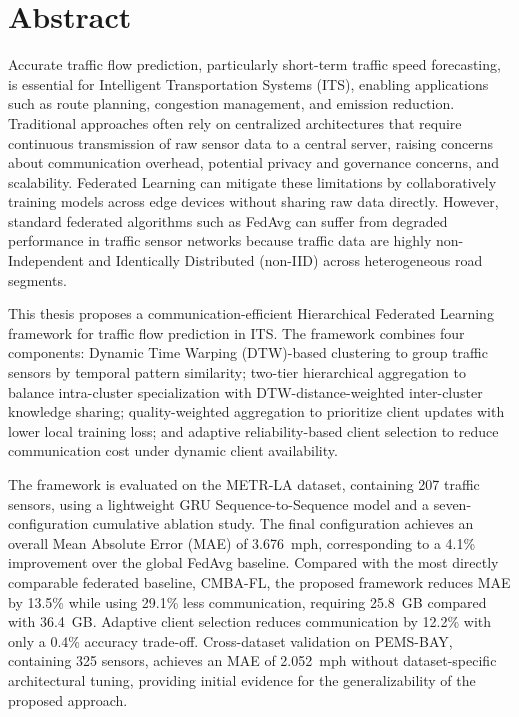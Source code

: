 \chapter*{Abstract}
\label{chap:abstract}

Accurate traffic flow prediction, particularly short-term traffic speed forecasting, is essential for Intelligent Transportation Systems (ITS), enabling applications such as route planning, congestion management, and emission reduction. Traditional approaches often rely on centralized architectures that require continuous transmission of raw sensor data to a central server, raising concerns about communication overhead, potential privacy and governance concerns, and scalability. Federated Learning can mitigate these limitations by collaboratively training models across edge devices without sharing raw data directly. However, standard federated algorithms such as FedAvg can suffer from degraded performance in traffic sensor networks because traffic data are highly non-Independent and Identically Distributed (non-IID) across heterogeneous road segments.

This thesis proposes a communication-efficient Hierarchical Federated Learning framework for traffic flow prediction in ITS. The framework combines four components: Dynamic Time Warping (DTW)-based clustering to group traffic sensors by temporal pattern similarity; two-tier hierarchical aggregation to balance intra-cluster specialization with DTW-distance-weighted inter-cluster knowledge sharing; quality-weighted aggregation to prioritize client updates with lower local training loss; and adaptive reliability-based client selection to reduce communication cost under dynamic client availability.

The framework is evaluated on the METR-LA dataset, containing 207 traffic sensors, using a lightweight GRU Sequence-to-Sequence model and a seven-configuration cumulative ablation study. The final configuration achieves an overall Mean Absolute Error (MAE) of 3.676~mph, corresponding to a 4.1\% improvement over the global FedAvg baseline. Compared with the most directly comparable federated baseline, CMBA-FL, the proposed framework reduces MAE by 13.5\% while using 29.1\% less communication, requiring 25.8~GB compared with 36.4~GB. Adaptive client selection reduces communication by 12.2\% with only a 0.4\% accuracy trade-off. Cross-dataset validation on PEMS-BAY, containing 325 sensors, achieves an MAE of 2.052~mph without dataset-specific architectural tuning, providing initial evidence for the generalizability of the proposed approach.

